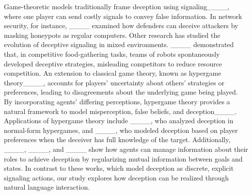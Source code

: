 
Game-theoretic models traditionally frame deception using signaling____, where one player can send costly signals to convey false information. 
In network security, for instance, ____ examined how defenders can deceive attackers by masking honeypots as regular computers. 
Other research has studied the evolution of deceptive signaling in mixed environments. 
____ demonstrated that, in competitive food-gathering tasks, teams of robots spontaneously developed deceptive strategies, misleading competitors to reduce resource competition.
An extension to classical game theory, known as hypergame theory____, accounts for players' uncertainty about others' strategies or preferences, leading to disagreements about the underlying game being played. 
By incorporating agents' differing perceptions, hypergame theory provides a natural framework to model misperception, false beliefs, and deception____. 
Applications of hypergame theory include ____, who analyzed deception in normal-form hypergames, and ____, who modeled deception based on player preferences when the deceiver has full knowledge of the target. 
Additionally, ____, ____, and ____ show how agents can manage information about their roles to achieve deception by regularizing mutual information between goals and states.
In contrast to these works, which model deception as discrete, explicit signaling actions, our study explores how deception can be realized through natural language interaction.

